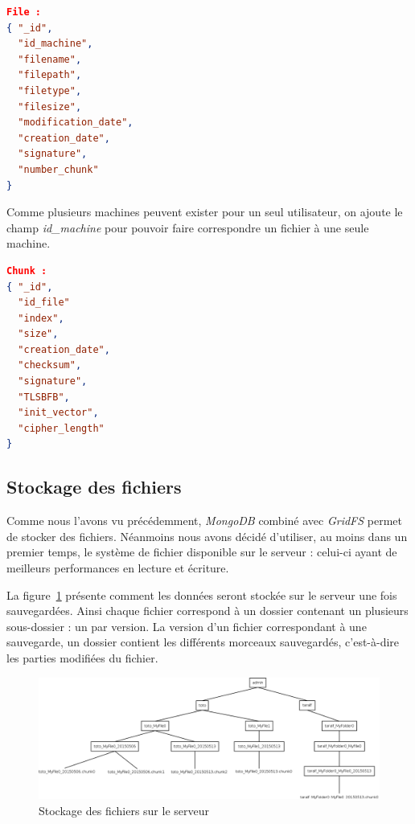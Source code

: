 \documentclass[a4paper,10pt, twoside]{report}
\begin{document}
\begin{spacing}{1.2}
\begin{lstlisting}[language=json]
File :
{ "_id",
  "id_machine",
  "filename",
  "filepath",
  "filetype",
  "filesize",
  "modification_date",
  "creation_date",
  "signature",
  "number_chunk"
}
\end{lstlisting}
Comme plusieurs machines peuvent exister pour un seul utilisateur, on ajoute
le champ \textit{id\_machine} pour pouvoir faire correspondre un fichier \`a
une seule machine.

\begin{lstlisting}[language=json]
Chunk :
{ "_id",
  "id_file"
  "index",
  "size",
  "creation_date",
  "checksum",
  "signature",
  "TLSBFB",
  "init_vector",
  "cipher_length"
}
\end{lstlisting}

\subsection{Stockage des fichiers}
Comme nous l'avons vu pr\'ec\'edemment, \textit{MongoDB} combin\'e avec
\textit{GridFS} permet de stocker des fichiers. N\'eanmoins nous avons
d\'ecid\'e d'utiliser, au moins dans un premier temps, le syst\`eme de fichier
disponible sur le serveur : celui-ci ayant de meilleurs performances en lecture
et \'ecriture.

La figure~\ref{fileSystemServer} pr\'esente comment les donn\'ees seront
stock\'ee sur le serveur une fois sauvegard\'ees. Ainsi chaque fichier
correspond \`a un dossier contenant un plusieurs sous-dossier : un par version.
La version d'un fichier correspondant \`a une sauvegarde, un dossier contient
les diff\'erents morceaux sauvegard\'es, c'est-\`a-dire les parties modifi\'ees
du fichier.

\begin{figure}[h!]
  \hspace{-4.5em}
  \includegraphics[width=19cm]{softwareDesign/fileSystemServer.png}
  \caption{\label{fileSystemServer} Stockage des fichiers sur le serveur}
\end{figure}


\end{spacing}
\end{document}
